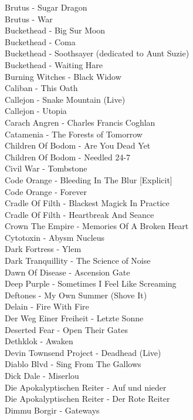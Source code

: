 Brutus - Sugar Dragon\\
Brutus - War\\
Buckethead - Big Sur Moon\\
Buckethead - Coma\\
Buckethead - Soothsayer (dedicated to Aunt Suzie)\\
Buckethead - Waiting Hare\\
Burning Witches - Black Widow\\
Caliban - This Oath\\
Callejon - Snake Mountain (Live)\\
Callejon - Utopia\\
Carach Angren - Charles Francis Coghlan\\
Catamenia - The Forests of Tomorrow\\
Children Of Bodom - Are You Dead Yet\\
Children Of Bodom - Needled 24-7\\
Civil War - Tombstone\\
Code Orange - Bleeding In The Blur [Explicit]\\
Code Orange - Forever\\
Cradle Of Filth - Blackest Magick In Practice\\
Cradle Of Filth - Heartbreak And Seance\\
Crown The Empire - Memories Of A Broken Heart\\
Cytotoxin - Abysm Nucleus\\
Dark Fortress - Ylem\\
Dark Tranquillity - The Science of Noise\\
Dawn Of Disease - Ascension Gate\\
Deep Purple - Sometimes I Feel Like Screaming\\
Deftones - My Own Summer (Shove It)\\
Delain - Fire With Fire\\
Der Weg Einer Freiheit - Letzte Sonne\\
Deserted Fear - Open Their Gates\\
Dethklok - Awaken\\
Devin Townsend Project - Deadhead (Live)\\
Diablo Blvd - Sing From The Gallows\\
Dick Dale - Miserlou\\
Die Apokalyptischen Reiter - Auf und nieder\\
Die Apokalyptischen Reiter - Der Rote Reiter\\
Dimmu Borgir - Gateways\\
